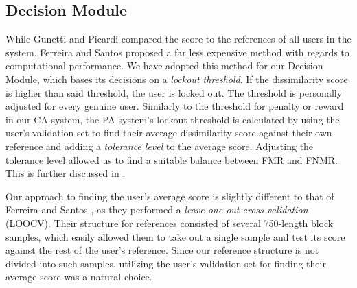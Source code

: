 \subsection{Decision Module}
\label{sec:system-design-PA-decision}
While Gunetti and Picardi \cite{gnp} compared the score to the references of all users in the system, Ferreira and Santos \cite{superResults} proposed a far less expensive method with regards to computational performance.
We have adopted this method for our Decision Module, which bases its decisions on a \textit{lockout threshold}.
If the dissimilarity score is higher than said threshold, the user is locked out.
The threshold is personally adjusted for every genuine user.
Similarly to the threshold for penalty or reward in our CA system, the PA system's lockout threshold is calculated by using the user's validation set to find their average dissimilarity score against their own reference and adding a \textit{tolerance level} to the average score.
Adjusting the tolerance level allowed us to find a suitable balance between FMR and FNMR.
This is further discussed in .

Our approach to finding the user's average score is slightly different to that of Ferreira and Santos \cite{superResults}, as they performed a \textit{leave-one-out cross-validation} (LOOCV).
Their structure for references consisted of several 750-length block samples, which easily allowed them to take out a single sample and test its score against the rest of the user's reference.
Since our reference structure is not divided into such samples, utilizing the user's validation set for finding their average score was a natural choice.


